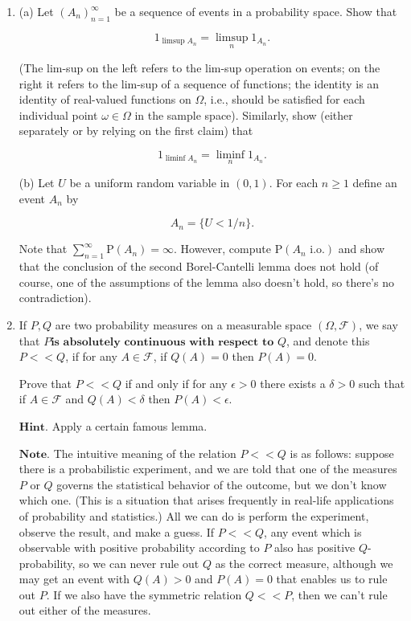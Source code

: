 \documentclass[11pt]{report}
\providecommand{\cal}{\mathcal}
\theoremstyle{plain}
\theoremstyle{definition}
\begin{document}
\begin{enumerate}[label=\arabic*.]
\item (a) Let $(A_n)_{n=1}^\infty$ be a sequence of events
in a probability space. Show that

\[
1_{\limsup A_n} = \limsup_n 1_{A_n}.
\]

(The lim-sup on the left refers to the lim-sup
operation on events; on the right it refers to the
lim-sup of a sequence of functions; the identity is an
identity of real-valued functions on $\Omega$, i.e.,
should be satisfied for each individual point
$\omega \in \Omega$ in the sample space). Similarly,
show (either separately or by relying on the first
claim) that

\[
1_{\liminf A_n} = \liminf_n 1_{A_n}.
\]

(b) Let $U$ be a uniform random variable in $(0,1)$.
For each $n\ge 1$ define an event $A_n$ by

\[
A_n = \{U < 1/n\}.
\]

Note that
$\sum_{n=1}^\infty \mathrm{P}(A_n) = \infty$.
However, compute $\mathrm{P}(A_n\textrm{ i.o.})$ and
show that the conclusion of the second Borel-Cantelli
lemma does not hold (of course, one of the assumptions
of the lemma also doesn't hold, so there's no
contradiction).

\item If $P,Q$ are two probability measures on a measurable
space $(\Omega, {\cal F})$, we say that $\textbf{$P
$is absolutely continuous with respect to } Q$, and
denote this $P<<Q$, if for any $A\in {\cal F}$, if
$Q(A)=0$ then $P(A)=0$.

Prove that $P<<Q$ if and only if for any $\epsilon>0$
there exists a $\delta>0$ such that if $A\in {\cal F}$
and $Q(A)<\delta$ then $P(A)<\epsilon$.

$\textbf{Hint.}$ Apply a certain famous lemma.

$\textbf{Note.}$ The intuitive meaning of the
relation $P<<Q$ is as follows: suppose there is a
probabilistic experiment, and we are told that one of
the measures $P$ or $Q$ governs the statistical
behavior of the outcome, but we don't know which one.
(This is a situation that arises frequently in
real-life applications of probability and statistics.)
All we can do is perform the experiment, observe the
result, and make a guess. If $P<<Q$, any event which
is observable with positive probability according to
$P$ also has positive $Q$-probability, so we can
never rule out $Q$ as the correct measure, although
we may get an event with $Q(A)>0$ and $P(A)=0$ that
enables us to rule out $P$. If we also have the
symmetric relation $Q<<P$, then we can't rule out
either of the measures.


\end{enumerate}
\end{document}
